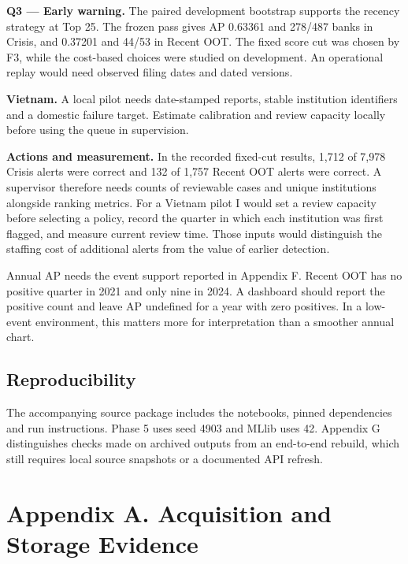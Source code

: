 \documentclass[
  12pt,
  a4paper,
]{article}
\renewcommand{\arraystretch}{1.16}
\newcommand{\parttag}{Main report}
\newcommand{\beginappendix}{\renewcommand{\parttag}{Appendix}}
\begin{document}
\textbf{Q3 --- Early warning.} The paired development bootstrap supports
the recency strategy at Top 25. The frozen pass gives AP 0.63361 and
278/487 banks in Crisis, and 0.37201 and 44/53 in Recent OOT. The fixed
score cut was chosen by F3, while the cost-based choices were studied on
development. An operational replay would need observed filing dates and
dated versions.

\textbf{Vietnam.} A local pilot needs date-stamped reports, stable
institution identifiers and a domestic failure target. Estimate
calibration and review capacity locally before using the queue in
supervision.

\textbf{Actions and measurement.} In the recorded fixed-cut results,
1,712 of 7,978 Crisis alerts were correct and 132 of 1,757 Recent OOT
alerts were correct. A supervisor therefore needs counts of reviewable
cases and unique institutions alongside ranking metrics. For a Vietnam
pilot I would set a review capacity before selecting a policy, record
the quarter in which each institution was first flagged, and measure
current review time. Those inputs would distinguish the staffing cost of
additional alerts from the value of earlier detection.

Annual AP needs the event support reported in Appendix F. Recent OOT has
no positive quarter in 2021 and only nine in 2024. A dashboard should
report the positive count and leave AP undefined for a year with zero
positives. In a low-event environment, this matters more for
interpretation than a smoother annual chart.

\subsection{Reproducibility}\label{reproducibility}

The accompanying source package includes the notebooks, pinned
dependencies and run instructions. Phase 5 uses seed 4903 and MLlib uses
42. Appendix G distinguishes checks made on archived outputs from an
end-to-end rebuild, which still requires local source snapshots or a
documented API refresh.

\clearpage

\beginappendix
\setlength{\parskip}{5pt plus .8pt minus .3pt}
\renewcommand{\arraystretch}{1.16}
\fontsize{12bp}{14.8bp}\selectfont

\section{Appendix A. Acquisition and Storage
Evidence}\label{appendix-a.-acquisition-and-storage-evidence}
\end{document}
